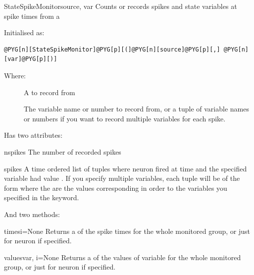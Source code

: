 \documentclass[letterpaper,10pt,english]{manual}
\begin{document}
\hypertarget{brian.StateSpikeMonitor}{}\begin{classdesc}{StateSpikeMonitor}{source, var}
Counts or records spikes and state variables at spike times from a \hyperlink{brian.NeuronGroup}{}

Initialised as:

\begin{Verbatim}[commandchars=@\[\]]
@PYG[n][StateSpikeMonitor]@PYG[p][(]@PYG[n][source]@PYG[p][,] @PYG[n][var]@PYG[p][)]
\end{Verbatim}

Where:
\begin{description}
\item[] \leavevmode
A \hyperlink{brian.NeuronGroup}{} to record from

\item[] \leavevmode
The variable name or number to record from, or a tuple of variable names or numbers
if you want to record multiple variables for each spike.

\end{description}

Has two attributes:

\hypertarget{brian.StateSpikeMonitor.nspikes}{}\begin{memberdesc}{nspikes}
The number of recorded spikes
\end{memberdesc}

\hypertarget{brian.StateSpikeMonitor.spikes}{}\begin{memberdesc}{spikes}
A time ordered list of tuples  where neuron  fired
at time  and the specified variable had value . If you
specify multiple variables, each tuple will be of the form
 where the  are the values corresponding
in order to the variables you specified in the  keyword.
\end{memberdesc}

And two methods:

\hypertarget{brian.StateSpikeMonitor.times}{}\begin{methoddesc}{times}{i=None}
Returns a  of the spike times for the whole monitored
group, or just for neuron  if specified.
\end{methoddesc}

\hypertarget{brian.StateSpikeMonitor.values}{}\begin{methoddesc}{values}{var, i=None}
Returns a  of the values of variable  for the
whole monitored group, or just for neuron  if specified.
\end{methoddesc}
\end{classdesc}
\end{document}
